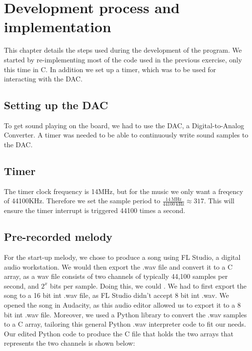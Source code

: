 \section{Development process and implementation}
\label{chap:development_process}

This chapter details the steps used during the development of the program.
We started by re-implementing most of the code used in the previous exercise, only this time in C.
In addition we set up a timer, which was to be used for interacting with the DAC.


\subsection{Setting up the DAC}

To get sound playing on the board, we had to use the DAC, a Digital-to-Analog Converter.
A timer was needed to be able to continuously write sound samples to the DAC.

\subsection{Timer}

The timer clock frequency is 14MHz, but for the music we only want a freqency of 44100KHz.
Therefore we set the sample period to $ \frac{\SI{14}{\mega\hertz}}{\SI{44100}{\kilo\hertz}} \approx 317 $.
This will ensure the timer interrupt is triggered 44100 times a second.



\subsection{Pre-recorded melody}

For the start-up melody, we chose to produce a song using FL Studio, a digital audio workstation. We would then export the .wav file and convert it to a C array, as a wav file consists of two channels of typically 44,100 samples per second, and $2^x$ bits per sample. Doing this, we could . We had to first export the song to a 16 bit int .wav file, as FL Studio didn't accept 8 bit int .wav. We opened the song in Audacity, as this audio editor allowed us to export it to a 8 bit int .wav file. Moreover, we used a Python library to convert the .wav samples to a C array, tailoring this general Python .wav interpreter code \cite{wav} to fit our needs. Our edited Python code to produce the C file that holds the two arrays that represents the two channels is shown below:

